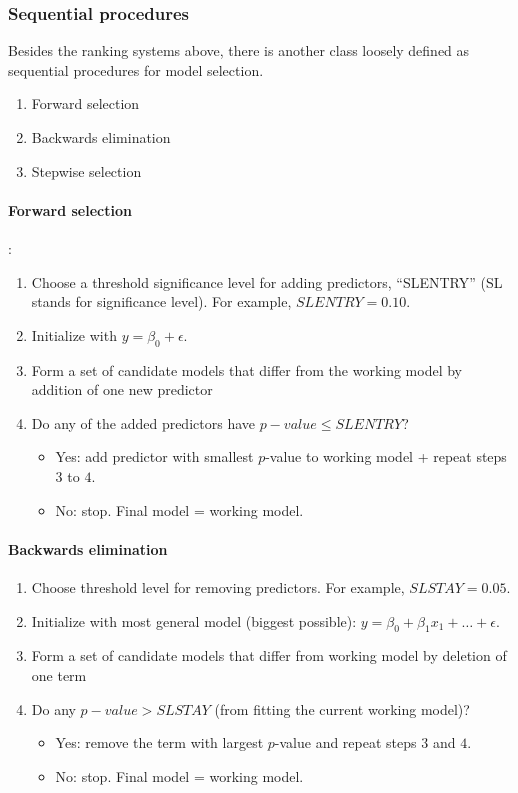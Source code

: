 \subsubsection*{Sequential procedures}
Besides the ranking systems above, there is another class loosely defined as sequential procedures for model selection.
\begin{enumerate}
	\item Forward selection
	\item Backwards elimination
	\item Stepwise selection
\end{enumerate}

\paragraph{Forward selection}:
\begin{enumerate}
	\item Choose a threshold significance level for adding predictors, ``SLENTRY'' (SL stands for significance level).  For example, $SLENTRY = 0.10$.
	\item Initialize with $y = \beta_0 + \epsilon$.
	\item Form a set of candidate models that differ from the working model by addition of one new predictor
	\item Do any of the added predictors have $p-value \le SLENTRY$?
	    \begin{itemize}
	    	\item Yes: add predictor with smallest $p$-value to working model + repeat steps $3$ to $4$.
	    	\item No: stop.  Final model = working model.
	    \end{itemize}
\end{enumerate}

\paragraph{Backwards elimination}
\begin{enumerate}
	\item Choose threshold level for removing predictors.  For example, $SLSTAY=0.05$.
	\item Initialize with most general model (biggest possible): $y = \beta_0 + \beta_1 x_1 + \dots + \epsilon$.
	\item Form a set of candidate models that differ from working model by deletion of one term
	\item Do any $p-value > SLSTAY$ (from fitting the current working model)?
	    \begin{itemize}
	    	\item Yes: remove the term with largest $p$-value and repeat steps $3$ and $4$.
	    	\item No: stop.  Final model = working model.
	    \end{itemize}
\end{enumerate}

